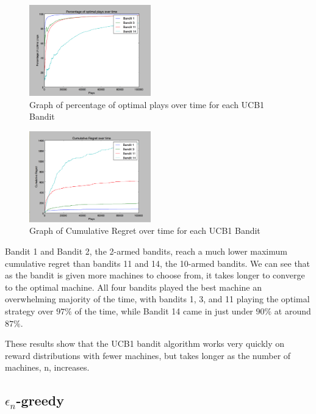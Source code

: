 \begin{figure}[htb]
  \centering 
  \includegraphics[width=0.47\textwidth]{ucb_plays_14.png}
  \caption{Graph of percentage of optimal plays over time for each UCB1 Bandit}
  \label{fig:UCB1 Percentage of optimal plays over time}
\end{figure}
\begin{figure}[htb]
  \centering 
  \includegraphics[width=0.47\textwidth]{ucb_regret_14.png}
  \caption{Graph of Cumulative Regret over time for each UCB1 Bandit}
  \label{fig:UCB1 Cumulative Regret over time}
\end{figure}

Bandit 1 and Bandit 2, the 2-armed bandits, reach a much lower maximum cumulative regret than bandits 11 and 14, the 10-armed bandits. We can see that as the bandit is given more machines to choose from, it takes longer to converge to the optimal machine. All four bandits played the best machine an overwhelming majority of the time, with bandits 1, 3, and 11 playing the optimal strategy over $97\%$ of the time, while Bandit 14 came in just under $90\%$ at around $87\%$.

These results show that the UCB1 bandit algorithm works very quickly on reward distributions with fewer machines, but takes longer as the number of machines, n, increases.

\subsection{$\epsilon_n$-greedy}
\label{subsec:$\epsilon_n$-greedy}

